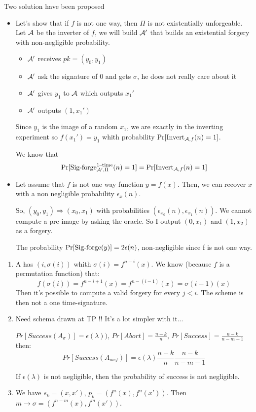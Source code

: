 \newape
\begin{solution}
  Two solution have been proposed
  \begin{itemize}
    \item
      Let's show that if $f$ is not one way, then $\Pi$ is not existentially unforgeable.
      Let $\mathcal{A}$ be the inverter of $f$, we will build $\mathcal{A}'$ that builds an existential forgery with non-negligible probability.

      \begin{itemize}
        \item $\mathcal{A}'$ receives $pk = (y_0, y_1)$
        \item $\mathcal{A}'$ ask the signature of 0 and gets $\sigma$, he does not really care about it
        \item $\mathcal{A}'$ gives $y_1$ to $\mathcal{A}$ which outputs $x_1'$
        \item $\mathcal{A}'$ outputs $(1, x_1')$
      \end{itemize}
      Since $y_1$ is the image of a random $x_1$, we are exactly in the inverting experiment so $f(x_1') = y_1$
      whith probability $\Pr[\operatorname{Invert}_{\mathcal{A},f}(n) = 1]$.

      We know that
      \[
        \Pr[\operatorname{Sig-forge}_{\mathcal{A}',\Pi}^{\text{1--time}}(n) = 1] = \Pr[\operatorname{Invert}_{\mathcal{A},f}(n) = 1]
      \]
    \item
      Let assume that $f$ is not one way function $y = f(x)$.
      Then, we can recover $x$ with a non negligible probability $\epsilon_x (n)$.

      So, $(y_0, y_1) \Rightarrow (x_0, x_1)$ with probabilities $(\epsilon_{x_0} (n), \epsilon_{x_1} (n))$.
      We cannot compute a pre-image by asking the oracle. So I output $(0, x_1)$ and $(1, x_2)$ as a forgery.

      The probability $\Pr[\operatorname{Sig-forge}(y)] = 2\epsilon(n)$, non-negligible since f is not one way.
  \end{itemize}
\end{solution}
\begin{solution}
  \begin{enumerate}
    \item
      A has $(i, \sigma(i))$ whith $\sigma (i) = f^{n-i} (x)$. We know (because $f$ is a permutation function) that:
      $$f(\sigma(i)) = f^{n-i+1}(x) = f^{n-(i-1)}(x) = \sigma(i-1)(x)$$
      Then it's possible to compute a valid forgery for every $j < i$. The scheme is then not a one time-signature.
    \item
      Need schema drawn at TP !! It's a lot simpler with it...

      $Pr[Success (A_\sigma)] = \epsilon(\lambda))$, $Pr[Abort] = \frac{n-k}{n}$, $Pr[Success] = \frac{n-k}{n-m-1}$ then:
      $$ Pr[Success(A_{owf})] = \epsilon(\lambda) \frac{n-k}{n} \frac{n-k}{n-m-1}$$

      If $\epsilon(\lambda)$ is not negligible, then the probability of success is not negligible.
    \item
      We have $s_k = (x, x')$, $p_k = (f^n(x), f^n(x'))$.
      Then $m \rightarrow \sigma = (f^{n-m}(x), f^m(x'))$.

  \end{enumerate}
\end{solution}
